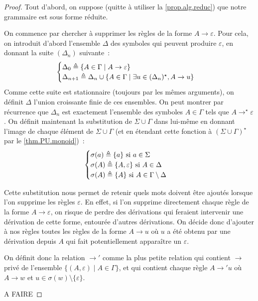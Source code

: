 \begin{proof}
  Tout d'abord, on suppose (quitte à utiliser la \cref{prop.alg.reduc}) que
  notre grammaire est sous forme réduite.

  On commence par chercher à supprimer les règles de la forme
  $A \to \varepsilon$. Pour cela, on introduit d'abord l'ensemble $\Delta$ des
  symboles qui peuvent produire $\varepsilon$, en donnant la suite
  $(\Delta_n)$ suivante~:
  \[\begin{cases}
  \Delta_0 \triangleq \{ A \in \Gamma\mid A \to \varepsilon\}\\
  \Delta_{n+1} \triangleq \Delta_n \cup \{A\in \Gamma\mid \exists u \in
  (\Delta_n)^\star, A \to u\}
  \end{cases}\]
  Comme cette suite est stationnaire (toujours par les mêmes arguments), on
  définit $\Delta$ l'union croissante finie de ces ensembles. On peut montrer
  par récurrence que $\Delta_n$ est exactement l'ensemble des symboles
  $A \in \Gamma$ tels que $A \to^\star \varepsilon$. On définit maintenant la
  substitution de $\Sigma\cup\Gamma$ dans lui-même en donnant l'image de
  chaque élément de $\Sigma\cup\Gamma$ (et en étendant cette fonction à
  $(\Sigma\cup\Gamma)^\star$ par le \cref{thm.PU.monoid})~:
  \[\begin{cases}
  \sigma(a) \triangleq \{a\} \text{ si } a \in \Sigma\\
  \sigma(A) \triangleq \{A , \varepsilon\} \text{ si } A \in \Delta\\
  \sigma(A) \triangleq \{A\} \text{ si } A \in\Gamma\setminus \Delta
  \end{cases}\]

  Cette substitution nous permet de retenir quels mots doivent être ajoutés
  lorsque l'on supprime les règles $\varepsilon$. En effet, si l'on supprime
  directement chaque règle de la forme $A \to \varepsilon$, on risque de perdre
  des dérivations qui feraient intervenir une dérivation de cette forme,
  entourée d'autres dérivations. On décide donc d'ajouter à nos règles toutes
  les règles de la forme $A \to u$ où $u$ a été obtenu par une dérivation depuis
  $A$ qui fait potentiellement apparaître un $\varepsilon$.

  On définit donc la relation $\to'$ comme la plus petite relation qui contient
  $\to$ privé de l'ensemble $\{(A,\varepsilon) \mid A \in \Gamma\}$, et qui
  contient chaque règle $A \to' u$ où $A \to w$ et
  $u \in \sigma(w)\setminus\{\varepsilon\}$.

  A FAIRE
\end{proof}

